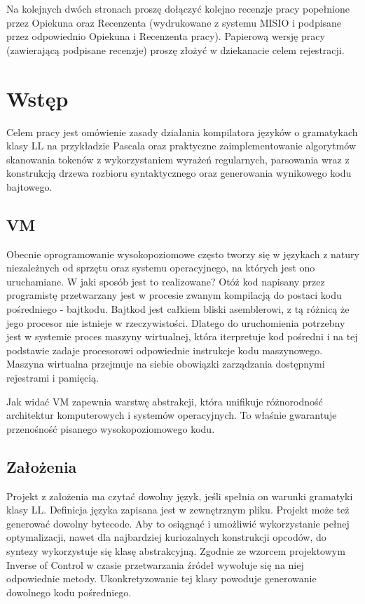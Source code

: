 \documentclass[a4paper,12pt]{article}
\begin{document}

\newpage
\linespread{1.3}
\selectfont

\noindent
Na kolejnych dwóch stronach proszę dołączyć kolejno recenzje pracy popełnione przez Opiekuna oraz Recenzenta (wydrukowane z systemu MISIO i podpisane przez odpowiednio Opiekuna i Recenzenta pracy). Papierową wersję pracy (zawierającą podpisane recenzje) proszę złożyć w dziekanacie celem rejestracji.

\vspace{85mm}
\newpage
\tableofcontents

\newpage
\section{Wstęp}
Celem pracy jest omówienie zasady działania kompilatora języków o gramatykach klasy LL na przykładzie Pascala oraz praktyczne zaimplementowanie algorytmów skanowania tokenów z wykorzystaniem wyrażeń regularnych, parsowania wraz z konstrukcją drzewa rozbioru syntaktycznego oraz generowania wynikowego kodu bajtowego.

\subsection{VM}
Obecnie oprogramowanie wysokopoziomowe często tworzy się w językach z natury niezależnych od sprzętu oraz systemu operacyjnego, na których jest ono uruchamiane. W jaki sposób jest to realizowane? Otóż kod napisany przez programistę przetwarzany jest w procesie zwanym kompilacją do postaci kodu pośredniego - bajtkodu. Bajtkod jest całkiem bliski asemblerowi, z tą różnicą że jego procesor nie istnieje w rzeczywistości. Dlatego do uruchomienia potrzebny jest w systemie proces maszyny wirtualnej, która iterpretuje kod pośredni i na tej podstawie zadaje procesorowi odpowiednie instrukcje kodu maszynowego. Maszyna wirtualna przejmuje na siebie obowiązki zarządzania dostępnymi rejestrami i pamięcią. 

Jak widać VM zapewnia warstwę abstrakcji, która unifikuje różnorodność architektur komputerowych i systemów operacyjnych. To właśnie gwarantuje przenośność pisanego wysokopoziomowego kodu.

\subsection{Założenia}
Projekt z założenia ma czytać dowolny język, jeśli spełnia on warunki gramatyki klasy LL. Definicja języka zapisana jest w zewnętrznym pliku. Projekt może też generować dowolny bytecode. Aby to osiągnąć i umożliwić wykorzystanie pełnej optymalizacji, nawet dla najbardziej kuriozalnych konstrukcji opcodów, do syntezy wykorzystuje się klasę abstrakcyjną. Zgodnie ze wzorcem projektowym Inverse of Control w czasie przetwarzania źródeł wywołuje się na niej odpowiednie metody. Ukonkretyzowanie tej klasy powoduje generowanie dowolnego kodu pośredniego.
\end{document}
